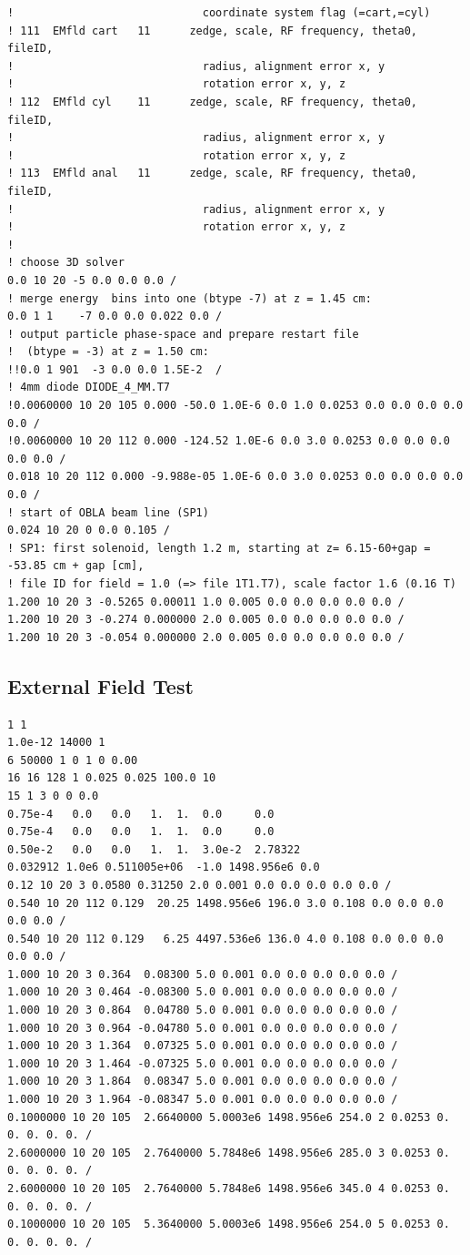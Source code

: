 \documentclass{psi-note}    %
\begin{document}
\begin{verbatim}
!                             coordinate system flag (=cart,=cyl)
! 111  EMfld cart   11      zedge, scale, RF frequency, theta0, fileID,
!                             radius, alignment error x, y
!                             rotation error x, y, z
! 112  EMfld cyl    11      zedge, scale, RF frequency, theta0, fileID,
!                             radius, alignment error x, y
!                             rotation error x, y, z
! 113  EMfld anal   11      zedge, scale, RF frequency, theta0, fileID,
!                             radius, alignment error x, y
!                             rotation error x, y, z
!
! choose 3D solver
0.0 10 20 -5 0.0 0.0 0.0 /
! merge energy  bins into one (btype -7) at z = 1.45 cm:
0.0 1 1    -7 0.0 0.0 0.022 0.0 /
! output particle phase-space and prepare restart file 
!  (btype = -3) at z = 1.50 cm:
!!0.0 1 901  -3 0.0 0.0 1.5E-2  /
! 4mm diode DIODE_4_MM.T7
!0.0060000 10 20 105 0.000 -50.0 1.0E-6 0.0 1.0 0.0253 0.0 0.0 0.0 0.0 0.0 /
!0.0060000 10 20 112 0.000 -124.52 1.0E-6 0.0 3.0 0.0253 0.0 0.0 0.0 0.0 0.0 /
0.018 10 20 112 0.000 -9.988e-05 1.0E-6 0.0 3.0 0.0253 0.0 0.0 0.0 0.0 0.0 /
! start of OBLA beam line (SP1)
0.024 10 20 0 0.0 0.105 /
! SP1: first solenoid, length 1.2 m, starting at z= 6.15-60+gap = -53.85 cm + gap [cm], 
! file ID for field = 1.0 (=> file 1T1.T7), scale factor 1.6 (0.16 T)
1.200 10 20 3 -0.5265 0.00011 1.0 0.005 0.0 0.0 0.0 0.0 0.0 /
1.200 10 20 3 -0.274 0.000000 2.0 0.005 0.0 0.0 0.0 0.0 0.0 /
1.200 10 20 3 -0.054 0.000000 2.0 0.005 0.0 0.0 0.0 0.0 0.0 /
\end{verbatim}

\subsection{External Field Test}
\begin{verbatim}
1 1
1.0e-12 14000 1
6 50000 1 0 1 0 0.00
16 16 128 1 0.025 0.025 100.0 10
15 1 3 0 0 0.0
0.75e-4   0.0   0.0   1.  1.  0.0     0.0
0.75e-4   0.0   0.0   1.  1.  0.0     0.0
0.50e-2   0.0   0.0   1.  1.  3.0e-2  2.78322
0.032912 1.0e6 0.511005e+06  -1.0 1498.956e6 0.0
0.12 10 20 3 0.0580 0.31250 2.0 0.001 0.0 0.0 0.0 0.0 0.0 /
0.540 10 20 112 0.129  20.25 1498.956e6 196.0 3.0 0.108 0.0 0.0 0.0 0.0 0.0 /
0.540 10 20 112 0.129   6.25 4497.536e6 136.0 4.0 0.108 0.0 0.0 0.0 0.0 0.0 /
1.000 10 20 3 0.364  0.08300 5.0 0.001 0.0 0.0 0.0 0.0 0.0 /
1.000 10 20 3 0.464 -0.08300 5.0 0.001 0.0 0.0 0.0 0.0 0.0 /
1.000 10 20 3 0.864  0.04780 5.0 0.001 0.0 0.0 0.0 0.0 0.0 /
1.000 10 20 3 0.964 -0.04780 5.0 0.001 0.0 0.0 0.0 0.0 0.0 /
1.000 10 20 3 1.364  0.07325 5.0 0.001 0.0 0.0 0.0 0.0 0.0 /
1.000 10 20 3 1.464 -0.07325 5.0 0.001 0.0 0.0 0.0 0.0 0.0 /
1.000 10 20 3 1.864  0.08347 5.0 0.001 0.0 0.0 0.0 0.0 0.0 /
1.000 10 20 3 1.964 -0.08347 5.0 0.001 0.0 0.0 0.0 0.0 0.0 /
0.1000000 10 20 105  2.6640000 5.0003e6 1498.956e6 254.0 2 0.0253 0. 0. 0. 0. 0. /
2.6000000 10 20 105  2.7640000 5.7848e6 1498.956e6 285.0 3 0.0253 0. 0. 0. 0. 0. /
2.6000000 10 20 105  2.7640000 5.7848e6 1498.956e6 345.0 4 0.0253 0. 0. 0. 0. 0. /
0.1000000 10 20 105  5.3640000 5.0003e6 1498.956e6 254.0 5 0.0253 0. 0. 0. 0. 0. /
\end{verbatim}
\end{document}
